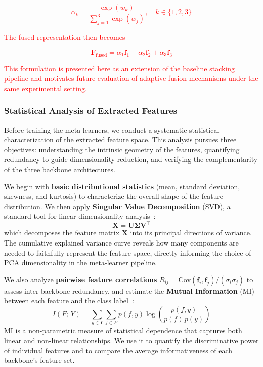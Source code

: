 \documentclass[pdflatex,sn-basic]{sn-jnl}
\begin{document}
\textcolor{red}{
\begin{equation}
\alpha_k = \frac{\exp(w_k)}{\sum_{j=1}^{3}\exp(w_j)}, \quad k \in \{1, 2, 3\}
\end{equation}
}

\textcolor{red}{The fused representation then becomes}

\textcolor{red}{
\begin{equation}
\mathbf{F}_{\text{fused}} = \alpha_1 \mathbf{f}_1 + \alpha_2 \mathbf{f}_2 + \alpha_3 \mathbf{f}_3
\label{eq:attention_fusion}
\end{equation}
}

\textcolor{red}{This formulation is presented here as an extension of the baseline stacking pipeline and motivates future evaluation of adaptive fusion mechanisms under the same experimental setting.}

\subsubsection{Statistical Analysis of Extracted Features}
\label{subsec:feature_statistics}

Before training the meta-learners, we conduct a systematic statistical characterization of the extracted feature space. This analysis pursues three objectives: understanding the intrinsic geometry of the features, quantifying redundancy to guide dimensionality reduction, and verifying the complementarity of the three backbone architectures.

We begin with \textbf{basic distributional statistics} (mean, standard deviation, skewness, and kurtosis) to characterize the overall shape of the feature distribution. We then apply \textbf{Singular Value Decomposition} (SVD), a standard tool for linear dimensionality analysis~\cite{golub1965calculating}:
\begin{equation}
    \mathbf{X} = \mathbf{U}\boldsymbol{\Sigma}\mathbf{V}^{\top}
    \label{eq:svd}
\end{equation}
which decomposes the feature matrix $\mathbf{X}$ into its principal directions of variance. The cumulative explained variance curve reveals how many components are needed to faithfully represent the feature space, directly informing the choice of PCA dimensionality in the meta-learner pipeline.

We also analyze \textbf{pairwise feature correlations} $R_{ij} = \mathrm{Cov}(\mathbf{f}_i,\mathbf{f}_j)/(\sigma_i\sigma_j)$ to assess inter-backbone redundancy, and estimate the \textbf{Mutual Information} (MI) between each feature and the class label~\cite{kraskov2004estimating}:
\begin{equation}
    I(F;\,Y) = \sum_{y \in Y}\sum_{f \in F} p(f,y)\log\!\left(\frac{p(f,y)}{p(f)\,p(y)}\right)
    \label{eq:mi}
\end{equation}
MI is a non-parametric measure of statistical dependence that captures both linear and non-linear relationships. We use it to quantify the discriminative power of individual features and to compare the average informativeness of each backbone's feature set.
\end{document}
